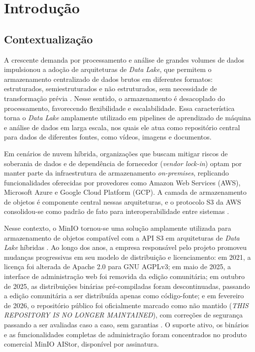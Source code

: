 \chapter{Introdução}
\label{chp:introducao}

\section{Contextualização}

A crescente demanda por processamento e análise de grandes volumes de dados
impulsionou a adoção de arquiteturas de \textit{Data Lake}, que permitem o
armazenamento centralizado de dados brutos em diferentes formatos:
estruturados, semiestruturados e não estruturados, sem necessidade de
transformação prévia \citep{tast2026comparative}. Nesse sentido, o armazenamento é
desacoplado do processamento, favorecendo flexibilidade e escalabilidade. Essa
característica torna o \textit{Data Lake} amplamente utilizado em pipelines de
aprendizado de máquina e análise de dados em larga escala, nos quais ele atua
como repositório central para dados de diferentes fontes, como vídeos, imagens
e documentos.

Em cenários de nuvem híbrida, organizações que buscam mitigar riscos de soberania
de dados e de dependência de fornecedor (\textit{vendor lock-in}) optam por manter
parte da infraestrutura de armazenamento \textit{on-premises}, replicando
funcionalidades oferecidas por provedores como Amazon Web Services (AWS), Microsoft
Azure e Google Cloud Platform (GCP). A camada de armazenamento de objetos é
componente central nessas arquiteturas, e o protocolo S3 da AWS consolidou-se como
padrão de fato para interoperabilidade entre sistemas \citep{tast2026comparative}.

Nesse contexto, o MinIO tornou-se uma solução amplamente utilizada para
armazenamento de objetos compatível com a API S3 em arquiteturas de \textit{Data Lake}
híbridas \citep{abdel2026pipeline}. Ao longo dos anos, a empresa responsável pelo
projeto promoveu mudanças progressivas em seu modelo de distribuição e licenciamento:
em 2021, a licença foi alterada de Apache 2.0 para GNU AGPLv3; em maio de 2025, a
interface de administração web foi removida da edição comunitária; em outubro de
2025, as distribuições binárias pré-compiladas foram descontinuadas, passando a
edição comunitária a ser distribuída apenas como código-fonte; e em fevereiro de
2026, o repositório público foi oficialmente marcado como não mantido
(\textit{THIS REPOSITORY IS NO LONGER MAINTAINED}), com correções de segurança
passando a ser avaliadas caso a caso, sem garantias \citep{minio2026repo,devpro2025,faun2026}.
O suporte ativo, os binários e as funcionalidades completas de administração foram
concentrados no produto comercial MinIO AIStor, disponível por assinatura.

